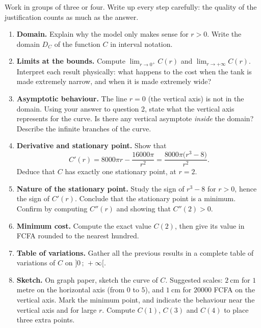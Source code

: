 \documentclass[11pt]{article}
\begin{document}
\begin{exercice}
Work in groups of three or four. Write up every step carefully: the quality of the justification counts as much as the answer.

\begin{enumerate}
\item \textbf{Domain.} Explain why the model only makes sense for $r > 0$. Write the domain $D_C$ of the function $C$ in interval notation.

\item \textbf{Limits at the bounds.} Compute $\displaystyle\lim_{r \to 0^{+}} C(r)$ and $\displaystyle\lim_{r \to +\infty} C(r)$. Interpret each result physically: what happens to the cost when the tank is made extremely narrow, and when it is made extremely wide?

\item \textbf{Asymptotic behaviour.} The line $r = 0$ (the vertical axis) is not in the domain. Using your answer to question 2, state what the vertical axis represents for the curve. Is there any vertical asymptote \emph{inside} the domain? Describe the infinite branches of the curve.

\item \textbf{Derivative and stationary point.} Show that
\[
C'(r) = 8000\pi r - \frac{16000\pi}{r^{2}} = \frac{8000\pi\bigl(r^{3} - 8\bigr)}{r^{2}}.
\]
Deduce that $C$ has exactly one stationary point, at $r = 2$.

\item \textbf{Nature of the stationary point.} Study the sign of $r^{3} - 8$ for $r > 0$, hence the sign of $C'(r)$. Conclude that the stationary point is a minimum. Confirm by computing $C''(r)$ and showing that $C''(2) > 0$.

\item \textbf{Minimum cost.} Compute the exact value $C(2)$, then give its value in FCFA rounded to the nearest hundred.

\item \textbf{Table of variations.} Gather all the previous results in a complete table of variations of $C$ on $]0\,;\,+\infty[$.

\item \textbf{Sketch.} On graph paper, sketch the curve of $C$. Suggested scales: $2\ \mathrm{cm}$ for $1$ metre on the horizontal axis (from $0$ to $5$), and $1\ \mathrm{cm}$ for $20000$ FCFA on the vertical axis. Mark the minimum point, and indicate the behaviour near the vertical axis and for large $r$. Compute $C(1)$, $C(3)$ and $C(4)$ to place three extra points.


\end{enumerate}
\end{exercice}
\end{document}
